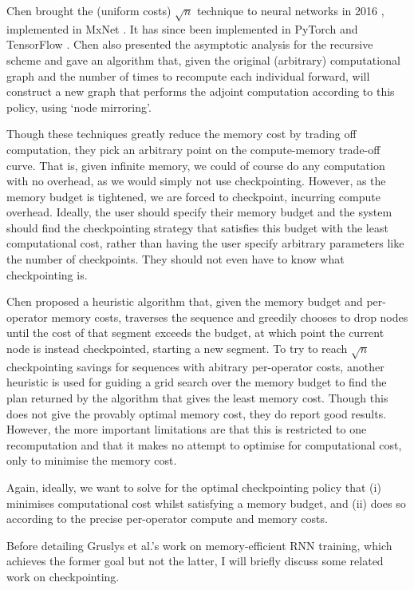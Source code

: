 Chen brought the (uniform costs) \(\sqrt{n}\) technique to neural networks in 2016 \cite{Chen2016}, implemented in MxNet \cite{mxnet-memonger}.
It has since been implemented in PyTorch \cite{torch-memonger} and TensorFlow \cite{openai-checkpointing}.
Chen also presented the asymptotic analysis for the recursive scheme and gave an algorithm that, given the original (arbitrary) computational graph and the number of times to recompute each individual forward, will construct a new graph that performs the adjoint computation according to this policy, using `node mirroring'.

Though these techniques greatly reduce the memory cost by trading off computation, they pick an arbitrary point on the compute-memory trade-off curve.
That is, given infinite memory, we could of course do any computation with no overhead, as we would simply not use checkpointing.
However, as the memory budget is tightened, we are forced to checkpoint, incurring compute overhead.
Ideally, the user should specify their memory budget and the system should find the checkpointing strategy that satisfies this budget with the least computational cost, rather than having the user specify arbitrary parameters like the number of checkpoints.
They should not even have to know what checkpointing is.

Chen proposed a heuristic algorithm that, given the memory budget and per-operator memory costs, traverses the sequence and greedily chooses to drop nodes until the cost of that segment exceeds the budget, at which point the current node is instead checkpointed, starting a new segment.
To try to reach \(\sqrt{n}\) checkpointing savings for sequences with abitrary per-operator costs, another heuristic is used for guiding a grid search over the memory budget to find the plan returned by the algorithm that gives the least memory cost.
Though this does not give the provably optimal memory cost, they do report good results.
However, the more important limitations are that this is restricted to one recomputation and that it makes no attempt to optimise for computational cost, only to minimise the memory cost.

Again, ideally, we want to solve for the optimal checkpointing policy that (i) minimises computational cost whilst satisfying a memory budget, and (ii) does so according to the precise per-operator compute and memory costs. 

Before detailing Gruslys et al.'s \cite{Gruslys2016} work on memory-efficient RNN training, which achieves the former goal but not the latter, I will briefly discuss some related work on checkpointing.

